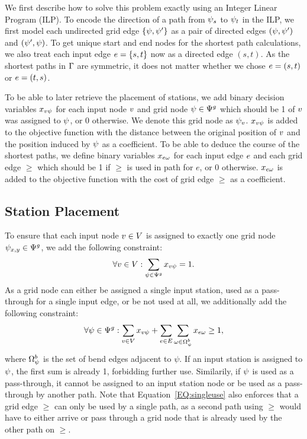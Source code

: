 \documentclass[sigconf]{acmart}
\begin{document}
We first describe how to solve this problem exactly using an Integer Linear Program (ILP).
To encode the direction of a path from $\psi_s$ to $\psi_t$ in the ILP, we first model each undirected grid edge $\{\psi, \psi'\}$ as a pair of directed edges $(\psi, \psi')$ and $(\psi', \psi)$.
To get unique start and end nodes for the shortest path calculations, we also treat each input edge $e = \{s, t\}$ now as a directed edge $(s, t)$.
As the shortest paths in $\Gamma$ are symmetric, it does not matter whether we chose $e = (s, t)$ or $e = (t, s)$.

To be able to later retrieve the placement of stations, we add binary decision variables $x_{v\psi}$ for each input node $v$ and grid node $\psi \in \Psi^g$ which should be 1 of $v$ was assigned to $\psi$, or 0 otherwise.
We denote this grid node as $\psi_v$.
$x_{v\psi}$ is added to the objective function with the distance between the original position of $v$ and the position induced by $\psi$ as a coefficient.
To be able to deduce the course of the shortest paths, we define binary variables $x_{e\omega}$ for each input edge $e$ and each grid edge $\ge$ which should be 1 if $\ge$ is used in path for $e$, or 0 otherwise.
$x_{e\omega}$ is added to the objective function with the cost of grid edge $\ge$ as a coefficient.

\subsection{Station Placement}

To ensure that each input node $v \in V$ is assigned to exactly one grid node $\psi_{x, y} \in \Psi^g$, we add the following constraint:
%
\begin{equation}
  \forall v \in V: \sum_{\psi \in \Psi^g} x_{v\psi} = 1. \label{EQ:onegvperiv}
\end{equation}
%
As a grid node can either be assigned a single input station, used as a pass-through for a single input edge, or be not used at all, we additionally add the following constraint:
%
\begin{equation}
  \forall \psi \in \Psi^g: \sum_{v \in V} x_{v\psi} + \sum_{e \in E} \sum_{\omega \in \Omega^b_\psi} x_{e\omega} \geq 1, \label{EQ:singleuse}
\end{equation}
%
where $\Omega^b_\psi$ is the set of bend edges adjacent to $\psi$. 
If an input station is assigned to $\psi$, the first sum is already 1, forbidding further use.
Similarily, if $\psi$ is used as a pass-through, it cannot be assigned to an input station node or be used as a pass-through by another path.
Note that Equation~\ref{EQ:singleuse} also enforces that a grid edge $\ge$ can only be used by a single path, as a second path using $\ge$ would have to either arrive or pass through a grid node that is already used by the other path on $\ge$.
\end{document}
